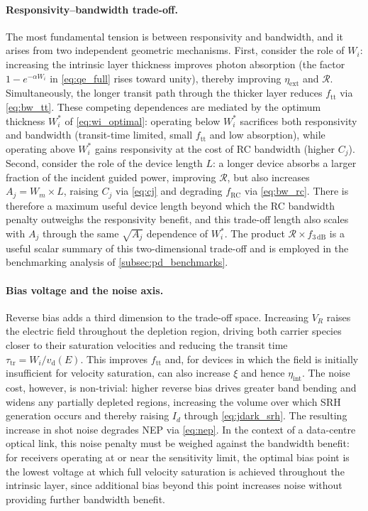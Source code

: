 \paragraph{Responsivity--bandwidth trade-off.}
The most fundamental tension is between responsivity and bandwidth, and it
arises from two independent geometric mechanisms. First, consider the role of
$W_i$: increasing the intrinsic layer thickness improves photon absorption
(the factor $1 - e^{-\alpha W_i}$ in \cref{eq:qe_full} rises toward unity),
thereby improving $\eta_{\mathrm{ext}}$ and $\mathcal{R}$. Simultaneously,
the longer transit path through the thicker layer reduces $f_{\mathrm{tt}}$
via \cref{eq:bw_tt}. These competing dependences are mediated by the optimum
thickness $W_i^*$ of \cref{eq:wi_optimal}: operating below $W_i^*$ sacrifices
both responsivity and bandwidth (transit-time limited, small $f_{\mathrm{tt}}$
and low absorption), while operating above $W_i^*$ gains responsivity at the
cost of RC bandwidth (higher $C_j$). Second, consider the role of the device
length $L$: a longer device absorbs a larger fraction of the incident guided
power, improving $\mathcal{R}$, but also increases $A_j = W_m \times L$,
raising $C_j$ via \cref{eq:cj} and degrading $f_{\mathrm{RC}}$ via
\cref{eq:bw_rc}. There is therefore a maximum useful device length beyond which
the RC bandwidth penalty outweighs the responsivity benefit, and this trade-off
length also scales with $A_j$ through the same $\sqrt{A_j}$ dependence of
$W_i^*$. The product $\mathcal{R} \times f_{3\,\mathrm{dB}}$ is a useful
scalar summary of this two-dimensional trade-off and is employed in the
benchmarking analysis of \cref{subsec:pd_benchmarks}.

\paragraph{Bias voltage and the noise axis.}
Reverse bias adds a third dimension to the trade-off space. Increasing $V_R$
raises the electric field throughout the depletion region, driving both carrier
species closer to their saturation velocities and reducing the transit time
$\tau_{\mathrm{tr}} = W_i / v_{\mathrm{d}}(E)$. This improves $f_{\mathrm{tt}}$
and, for devices in which the field is initially insufficient for velocity
saturation, can also increase $\xi$ and hence $\eta_{\mathrm{int}}$. The noise
cost, however, is non-trivial: higher reverse bias drives greater band bending
and widens any partially depleted regions, increasing the volume over which SRH
generation occurs and thereby raising $I_d$ through \cref{eq:jdark_srh}. The
resulting increase in shot noise degrades NEP via \cref{eq:nep}. In the context
of a data-centre optical link, this noise penalty must be weighed against the
bandwidth benefit: for receivers operating at or near the sensitivity limit, the
optimal bias point is the lowest voltage at which full velocity saturation is
achieved throughout the intrinsic layer, since additional bias beyond this point
increases noise without providing further bandwidth benefit.

